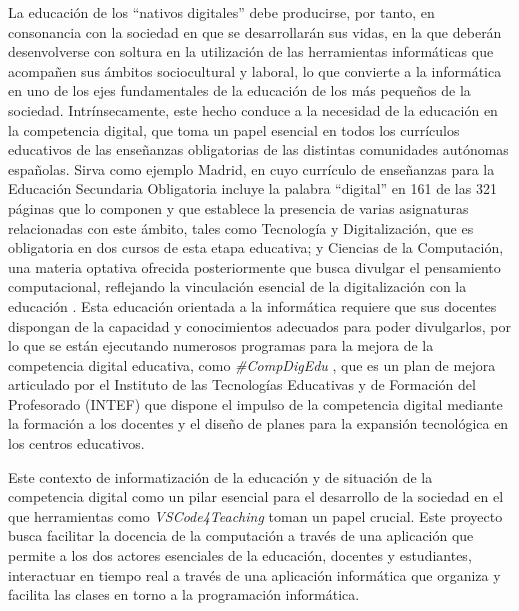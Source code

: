 La educación de los ``nativos digitales'' debe producirse, por tanto, en consonancia con la sociedad en que se desarrollarán sus vidas, en la que deberán desenvolverse con soltura en la utilización de las herramientas informáticas que acompañen sus ámbitos sociocultural y laboral, lo que convierte a la informática en uno de los ejes fundamentales de la educación de los más pequeños de la sociedad. Intrínsecamente, este hecho conduce a la necesidad de la educación en la competencia digital, que toma un papel esencial en todos los currículos educativos de las enseñanzas obligatorias de las distintas comunidades autónomas españolas. Sirva como ejemplo Madrid, en cuyo currículo de enseñanzas para la Educación Secundaria Obligatoria incluye la palabra ``digital'' en 161 de las 321 páginas que lo componen y que establece la presencia de varias asignaturas relacionadas con este ámbito, tales como Tecnología y Digitalización, que es obligatoria en dos cursos de esta etapa educativa; y Ciencias de la Computación, una materia optativa ofrecida posteriormente que busca divulgar el pensamiento computacional, reflejando la vinculación esencial de la digitalización con la educación \cite{CAMCurriculoESO}. Esta educación orientada a la informática requiere que sus docentes dispongan de la capacidad y conocimientos adecuados para poder divulgarlos, por lo que se están ejecutando numerosos programas para la mejora de la competencia digital educativa, como \textit{\#CompDigEdu} \cite{CompDigEduINTEF}, que es un plan de mejora articulado por el Instituto de las Tecnologías Educativas y de Formación del Profesorado (INTEF) que dispone el impulso de la competencia digital mediante la formación a los docentes y el diseño de planes para la expansión tecnológica en los centros educativos.

Este contexto de informatización de la educación y de situación de la competencia digital como un pilar esencial para el desarrollo de la sociedad en el que herramientas como \textit{VSCode4Teaching} toman un papel crucial. Este proyecto busca facilitar la docencia de la computación a través de una aplicación que permite a los dos actores esenciales de la educación, docentes y estudiantes, interactuar en tiempo real a través de una aplicación informática que organiza y facilita las clases en torno a la programación informática.

